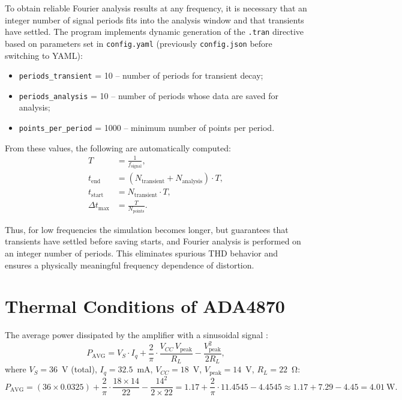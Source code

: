 \documentclass[a4paper, 12pt]{article}
\begin{document}
To obtain reliable Fourier analysis results at any frequency, it is necessary
that an integer number of signal periods fits into the analysis window and
that transients have settled. The program implements dynamic generation of
the \texttt{.tran} directive based on parameters set in \texttt{config.yaml}
(previously \texttt{config.json} before switching to YAML):

\begin{itemize}
    \item \texttt{periods\_transient} = 10 – number of periods for transient decay;
    \item \texttt{periods\_analysis} = 10 – number of periods whose data are saved for analysis;
    \item \texttt{points\_per\_period} = 1000 – minimum number of points per period.
\end{itemize}

From these values, the following are automatically computed:
\begin{align}
    T &= \frac{1}{f_{\text{signal}}},\\
    t_{\text{end}} &= (N_{\text{transient}} + N_{\text{analysis}}) \cdot T,\\
    t_{\text{start}} &= N_{\text{transient}} \cdot T,\\
    \Delta t_{\text{max}} &= \frac{T}{N_{\text{points}}}.
\end{align}

Thus, for low frequencies the simulation becomes longer, but guarantees that
transients have settled before saving starts, and Fourier analysis is performed
on an integer number of periods. This eliminates spurious THD behavior and
ensures a physically meaningful frequency dependence of distortion.

\section{Thermal Conditions of ADA4870}

The average power dissipated by the amplifier with a sinusoidal
signal \cite{ADA4870_ds}:
\begin{equation}
  P_{\text{AVG}} = V_S \cdot I_q
    + \frac{2}{\pi}\cdot\frac{V_{CC}\,V_{\text{peak}}}{R_L}
    - \frac{V_{\text{peak}}^2}{2R_L},
  \label{eq:power}
\end{equation}
where \(V_S = 36\)~V (total), \(I_q = 32.5\)~mA,
\(V_{CC} = 18\)~V, \(V_{\text{peak}} = 14\)~V, \(R_L = 22\)~Ω:
\[
    P_{\text{AVG}} = (36 \times 0.0325)
    + \frac{2}{\pi}\cdot\frac{18 \times 14}{22}
    - \frac{14^2}{2 \times 22}
    = 1.17 + \frac{2}{\pi}\cdot 11.4545 - 4.4545
    \approx 1.17 + 7.29 - 4.45 = 4.01\ \text{W}.
\]
\end{document}
